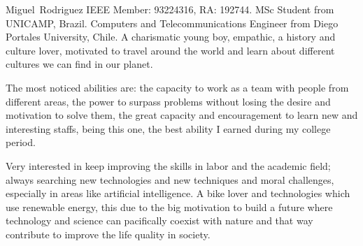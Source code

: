 \documentclass[journal]{IEEEtran}
\begin{document}




\begin{IEEEbiography}{Miguel~Rodriguez}
	IEEE Member: 93224316, RA: 192744. MSc Student from UNICAMP, Brazil. Computers and Telecommunications Engineer from Diego Portales University, Chile. A charismatic young boy, empathic, a history and culture lover, motivated to travel around the world and learn about different cultures we can find in our planet. 
	
	The most noticed abilities are: the capacity to work as a team with people from different areas, the power to surpass problems without losing the desire and motivation to solve them, the great capacity and encouragement to learn new and interesting staffs, being this one, the best ability I earned during my college period. 
	
	Very interested in keep improving the skills in labor and the academic field; always searching new technologies and new techniques and moral challenges, especially in areas like artificial intelligence. A bike lover and technologies which use renewable energy, this due to the big motivation to build a future where technology and science can pacifically coexist with nature and that way contribute to improve the life quality in society.
\end{IEEEbiography}


\ifCLASSOPTIONcaptionsoff
  \newpage
\fi





%
%
%
\end{document}
